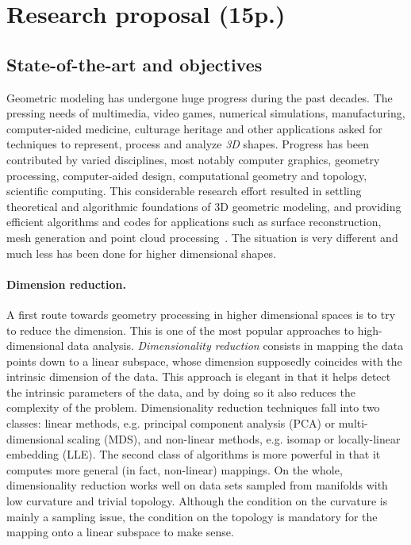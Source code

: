 \section{Research proposal (15p.)}

\subsection{State-of-the-art and objectives}

Geometric modeling has undergone huge progress during the past decades. The pressing needs
of multimedia, video games, numerical simulations, manufacturing, computer-aided medicine, culturage heritage and other applications asked for techniques to represent, process and analyze
{\em 3D} shapes.  Progress has been contributed by  varied disciplines, most notably computer graphics, geometry processing, computer-aided design, computational geometry and topology, scientific computing. This considerable research effort resulted in settling theoretical and algorithmic foundations of 3D geometric modeling, and providing efficient algorithms and codes for applications such as surface reconstruction, mesh generation and point cloud processing~\cite{geometrica-bcmrv-ms-06,dey-csr-2007}.  
The situation is very different and much less has been done for higher dimensional shapes.%


\paragraph{Dimension reduction.} A first route towards geometry processing in higher dimensional spaces is to try to reduce the dimension. This is 
one of the most popular approaches to high-dimensional data analysis. {\em Dimensionality reduction} consists in mapping the data points down to a linear subspace, whose dimension supposedly coincides with the intrinsic dimension of the data. This approach is elegant in that it helps detect the intrinsic parameters of the data, and by doing so it also reduces the complexity of the problem. Dimensionality reduction techniques fall into two classes: linear methods, e.g. principal component analysis (PCA) or multi-dimensional scaling (MDS), and non-linear methods, e.g. isomap or locally-linear embedding (LLE). The second class of algorithms is more powerful in that it computes more general (in fact, non-linear) mappings. On the whole, dimensionality reduction works well on data sets sampled from manifolds with low curvature and trivial topology. Although the condition on the curvature is mainly a sampling issue, the condition on the topology is mandatory for the mapping onto a linear subspace to make sense. 

